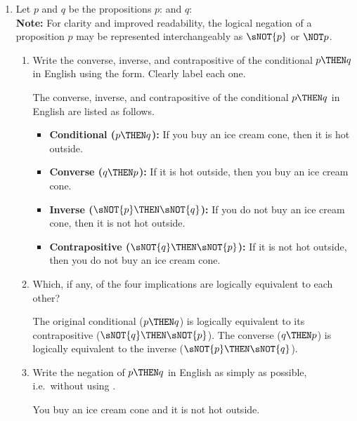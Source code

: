 \begin{enumerate}
  \item Let $p$ and $q$ be the propositions $p$: 
  and $q$: \\
  {\color{redcolor}\textbf{Note:} For clarity and improved readability, 
  the logical negation of a proposition $p$ may be represented 
  interchangeably as $\sNOT{p}$ or $\NOT p$.}
  \begin{enumerate}[label=(\alph*)]
    \item Write the converse, inverse, and contrapositive of the conditional
    $p \THEN q$ in English using the  form.  
    Clearly label each one.
    \begin{subanswer}
      The converse, inverse, and contrapositive of the conditional $p \THEN q$ in English are listed as follows.
      \begin{itemize}
        \item \textbf{Conditional ($p \THEN q$):} If you buy an ice cream cone, then it is hot outside.
        \item \textbf{Converse ($q \THEN p$):} If it is hot outside, then you buy an ice cream cone.
        \item \textbf{Inverse ($\sNOT{p} \THEN \sNOT{q}$):} If you do not buy an ice cream cone, then it is not hot outside.
        \item \textbf{Contrapositive ($\sNOT{q} \THEN \sNOT{p}$):} If it is not hot outside, then you do not buy an ice cream cone.
      \end{itemize}
    \end{subanswer}
    \item Which, if any,
    of the four implications are logically equivalent to each other?
    \begin{subanswer}
      The original conditional ($p \THEN q$) is logically equivalent to its 
      contrapositive ($\sNOT{q} \THEN \sNOT{p} $). The converse ($q \THEN p$) 
      is logically equivalent to the inverse ($\sNOT{p} \THEN \sNOT{q}$).

    \end{subanswer}
    \item Write the negation of $p \THEN q$ in English as simply as possible, i.e.\ 
    without using .
    \begin{subanswer}
      You buy an ice cream cone and it is not hot outside.
    \end{subanswer}
  \end{enumerate}


\end{enumerate}
